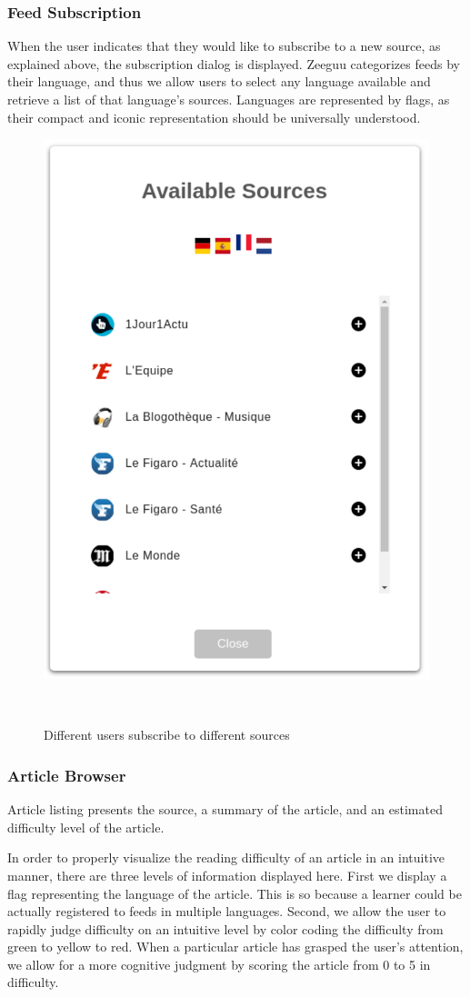 \subsubsection{Feed Subscription}
When the user indicates that they would like to subscribe to a new source, as explained above, the subscription dialog is displayed. Zeeguu categorizes feeds by their language, and thus we allow users to select any language available and retrieve a list of that language's sources. Languages are represented by flags, as their compact and iconic representation should be universally understood.

\begin{figure}[h!]
\centering
  \includegraphics[width=0.4\columnwidth]{figures/available_sources}
  \caption{Different users subscribe to different sources}~\label{fig:system_subscriptions}
\end{figure}


\subsubsection{Article Browser}

Article listing presents the source, a summary of the article, and an estimated difficulty level of the article.

In order to properly visualize the reading difficulty of an article in an intuitive manner, there are three levels of information displayed here. First we display a flag representing the language of the article. This is so because a learner could be actually registered to feeds in multiple languages. Second, we allow the user to rapidly judge difficulty on an intuitive level by color coding the difficulty from green to yellow to red. When a particular article has grasped the user's attention, we allow for a more cognitive judgment by scoring the article from 0 to 5 in difficulty.

